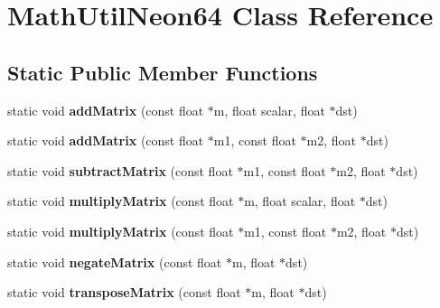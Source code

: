 \hypertarget{classMathUtilNeon64}{}\section{Math\+Util\+Neon64 Class Reference}
\label{classMathUtilNeon64}
\subsection*{Static Public Member Functions}
\begin{DoxyCompactItemize}
\item 
\mbox{\label{classMathUtilNeon64_aec73ba3676499728cc73a3893b4efb56}} 
static void {\bfseries add\+Matrix} (const float $\ast$m, float scalar, float $\ast$dst)
\item 
\mbox{\label{classMathUtilNeon64_a89dfc519c4dfd6924478f4deebb3c6c2}} 
static void {\bfseries add\+Matrix} (const float $\ast$m1, const float $\ast$m2, float $\ast$dst)
\item 
\mbox{\label{classMathUtilNeon64_a8d3d860244bcf400b6908252307a86c0}} 
static void {\bfseries subtract\+Matrix} (const float $\ast$m1, const float $\ast$m2, float $\ast$dst)
\item 
\mbox{\label{classMathUtilNeon64_acd42b9db56e782bdb702de7f8706cd7f}} 
static void {\bfseries multiply\+Matrix} (const float $\ast$m, float scalar, float $\ast$dst)
\item 
\mbox{\label{classMathUtilNeon64_abdccf5647cf8cd972371e2965e3dd2ec}} 
static void {\bfseries multiply\+Matrix} (const float $\ast$m1, const float $\ast$m2, float $\ast$dst)
\item 
\mbox{\label{classMathUtilNeon64_aaa35a6508a1441c95906ef980137879f}} 
static void {\bfseries negate\+Matrix} (const float $\ast$m, float $\ast$dst)
\item 
\mbox{\label{classMathUtilNeon64_a239a1876541f627af1a1ffd4b426e3a9}} 
static void {\bfseries transpose\+Matrix} (const float $\ast$m, float $\ast$dst)
\item 
\mbox{\label{classMathUtilNeon64_aa0f4ae397cca250cd67e05b6dc0e56f6}} 

\end{DoxyCompactItemize}
